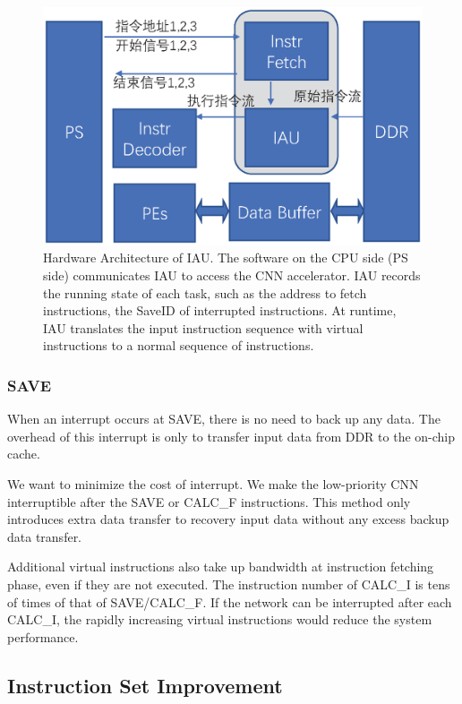 \begin{figure}[t]
	\centering
	\includegraphics[width=0.99\linewidth]{fig/iau.eps}
	\caption{Hardware Architecture of IAU. The software on the CPU side (PS side) communicates IAU to access the CNN accelerator. IAU records the running state of each task, such as the address to fetch instructions, the SaveID of interrupted instructions. At runtime, IAU translates the input instruction sequence with virtual instructions to a normal sequence of instructions. }
	\label{fig:IAU}
\end{figure}

\subsubsection{SAVE}
When an interrupt occurs at SAVE, there is no need to back up any data. The overhead of this interrupt is only to transfer input data from DDR to the on-chip cache. 

We want to minimize the cost of interrupt. We make the low-priority CNN interruptible after the SAVE or CALC\_F instructions. This method only introduces extra data transfer to recovery input data without any excess backup data transfer.

Additional virtual instructions also take up bandwidth at instruction fetching phase, even if they are not executed. The instruction number of CALC\_I is tens of times of that of SAVE/CALC\_F. If the network can be interrupted after each CALC\_I, the rapidly increasing virtual instructions would reduce the system performance.

\subsection{ Instruction Set Improvement }
\label{sec:virtualinstr}

